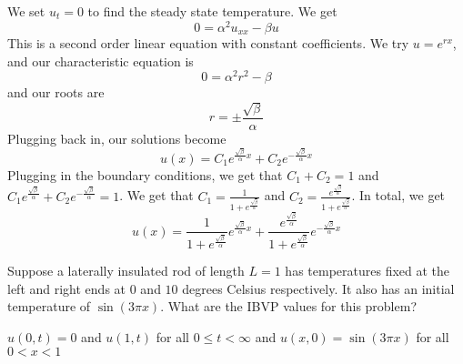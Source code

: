 \documentclass{article}
\begin{document}
\begin{solution}
We set $u_t = 0$ to find the steady state temperature. We get $$0= \alpha^2u_{xx} - \beta u$$This is a second order linear equation with constant coefficients. We try $u = e^{rx}$, and our characteristic equation is $$0 = \alpha^2r^2 - \beta$$ and our roots are $$r = \pm \frac{\sqrt{\beta}}{\alpha}$$Plugging back in, our solutions become $$u(x) = C_1e^{\frac{\sqrt{\beta}}{\alpha}x} + C_2e^{-\frac{\sqrt{\beta}}{\alpha}x}$$Plugging in the boundary conditions, we get that $C_1 + C_2 = 1$ and $C_1e^{\frac{\sqrt{\beta}}{\alpha}} + C_2e^{-\frac{\sqrt{\beta}}{\alpha}} = 1$. We get that $C_1 = \frac{1}{1+ e^{\frac{\sqrt{\beta}}{\alpha}}}$ and $C_2 = \frac{e^{\frac{\sqrt{\beta}}{\alpha}}}{1+e^\frac{\sqrt{\beta}}{\alpha}}$. In total, we get $$u(x) = \frac{1}{1+ e^{\frac{\sqrt{\beta}}{\alpha}}}e^{\frac{\sqrt{\beta}}{\alpha}x} + \frac{e^{\frac{\sqrt{\beta}}{\alpha}}}{1+e^\frac{\sqrt{\beta}}{\alpha}}e^{-\frac{\sqrt{\beta}}{\alpha}x}$$
\end{solution}

\begin{exercise}
Suppose a laterally insulated rod of length $L = 1$ has temperatures fixed at the left and right ends at $0$ and $10$ degrees Celsius respectively. It also has an initial temperature of $\sin(3\pi x)$. What are the IBVP values for this problem?
\end{exercise}

\begin{solution}
$u(0,t) = 0$ and $u(1,t)$ for all $0 \leq t < \infty$ and $u(x,0) = \sin(3\pi x)$ for all $0 < x < 1$
\end{solution}
\end{document}
